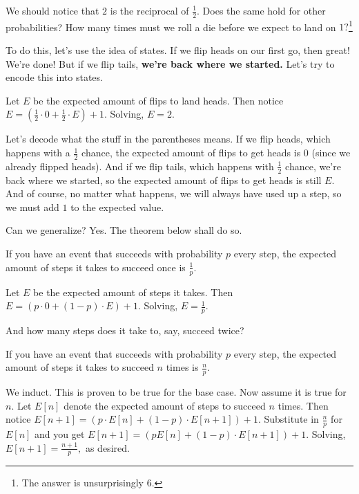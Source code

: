 \documentclass{article}
\begin{document}
We should notice that $2$ is the reciprocal of $\frac{1}{2}.$ Does the same hold for other probabilities? How many times must we roll a die before we expect to land on $1?$\footnote{The answer is unsurprisingly $6.$}

To do this, let's use the idea of states. If we flip heads on our first go, then great! We're done! But if we flip tails, \textbf{we're back where we started.} Let's try to encode this into states.

\begin{sol}
Let $E$ be the expected amount of flips to land heads. Then notice $E=(\frac{1}{2}\cdot 0+\frac{1}{2}\cdot E)+1.$ Solving, $E=2.$
\end{sol}
Let's decode what the stuff in the parentheses means. If we flip heads, which happens with a $\frac{1}{2}$ chance, the expected amount of flips to get heads is $0$ (since we already flipped heads). And if we flip tails, which happens with $\frac{1}{2}$ chance, we're back where we started, so the expected amount of flips to get heads is still $E.$ And of course, no matter what happens, we will always have used up a step, so we must add $1$ to the expected value.

Can we generalize? Yes. The theorem below shall do so.

\begin{theo}
If you have an event that succeeds with probability $p$ every step, the expected amount of steps it takes to succeed once is $\frac{1}{p}.$
\end{theo}

\begin{pro}
Let $E$ be the expected amount of steps it takes. Then $E=(p\cdot 0+(1-p)\cdot E)+1.$ Solving, $E=\frac{1}{p}.$
\end{pro}

And how many steps does it take to, say, succeed twice?

\begin{theo}
If you have an event that succeeds with probability $p$ every step, the expected amount of steps it takes to succeed $n$ times is $\frac{n}{p}.$
\end{theo}

\begin{pro}
We induct. This is proven to be true for the base case. Now assume it is true for $n.$ Let $E[n]$ denote the expected amount of steps to succeed $n$ times. Then notice $E[n+1]=(p\cdot E[n]+(1-p)\cdot E[n+1])+1.$ Substitute in $\frac{n}{p}$ for $E[n]$ and you get $E[n+1]=(pE[n]+(1-p)\cdot E[n+1])+1.$ Solving, $E[n+1]=\frac{n+1}{p},$ as desired.
\end{pro}
\end{document}
